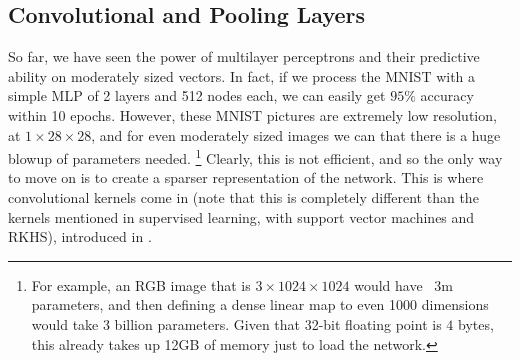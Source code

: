 \documentclass{article}
\begin{document}
  \subsection{Convolutional and Pooling Layers} 

    So far, we have seen the power of multilayer perceptrons and their predictive ability on moderately sized vectors. In fact, if we process the MNIST with a simple MLP of 2 layers and 512 nodes each, we can easily get $95\%$ accuracy within 10 epochs. However, these MNIST pictures are extremely low resolution, at $1 \times 28 \times 28$, and for even moderately sized images we can that there is a huge blowup of parameters needed. \footnote{For example, an RGB image that is $3 \times 1024 \times 1024$ would have ~3m parameters, and then defining a dense linear map to even 1000 dimensions would take 3 billion parameters. Given that 32-bit floating point is $4$ bytes, this already takes up 12GB of memory just to load the network.} Clearly, this is not efficient, and so the only way to move on is to create a sparser representation of the network. This is where convolutional kernels come in (note that this is completely different than the kernels mentioned in supervised learning, with support vector machines and RKHS), introduced in \cite{Lecun1998ConvNets}. 
\end{document}

